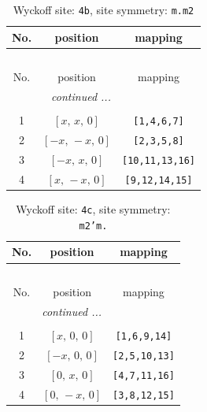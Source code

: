 \documentclass[fleqn,8pt]{jsarticle}
\begin{document}
\begin{longtable}{ccc}
\caption{Wyckoff site: {\tt 4b}, site symmetry: {\tt m.m2}}
 \\
 \hline \hline
No. & position & mapping \\ \hline \endfirsthead

\multicolumn{2}{l}{\tablename\ \thetable{}} \\
 \hline \hline
No. & position & mapping \\ \hline \endhead

 \hline \hline
\multicolumn{2}{r}{\footnotesize\it continued ...} \\ \endfoot

 \hline \hline
\multicolumn{2}{r}{} \\ \endlastfoot

1 & $\left[ x,\, x,\, 0 \right]$ & {\tt [1,4,6,7]} \\ \hline
2 & $\left[ - x,\, - x,\, 0 \right]$ & {\tt [2,3,5,8]} \\ \hline
3 & $\left[ - x,\, x,\, 0 \right]$ & {\tt [10,11,13,16]} \\ \hline
4 & $\left[ x,\, - x,\, 0 \right]$ & {\tt [9,12,14,15]} \\
\end{longtable}
\renewcommand{\arraystretch}{1.2}
\begin{longtable}{ccc}
\caption{Wyckoff site: {\tt 4c}, site symmetry: {\tt m2'm.}}
 \\
 \hline \hline
No. & position & mapping \\ \hline \endfirsthead

\multicolumn{2}{l}{\tablename\ \thetable{}} \\
 \hline \hline
No. & position & mapping \\ \hline \endhead

 \hline \hline
\multicolumn{2}{r}{\footnotesize\it continued ...} \\ \endfoot

 \hline \hline
\multicolumn{2}{r}{} \\ \endlastfoot

1 & $\left[ x,\, 0,\, 0 \right]$ & {\tt [1,6,9,14]} \\ \hline
2 & $\left[ - x,\, 0,\, 0 \right]$ & {\tt [2,5,10,13]} \\ \hline
3 & $\left[ 0,\, x,\, 0 \right]$ & {\tt [4,7,11,16]} \\ \hline
4 & $\left[ 0,\, - x,\, 0 \right]$ & {\tt [3,8,12,15]} \\
\end{longtable}
\end{document}
